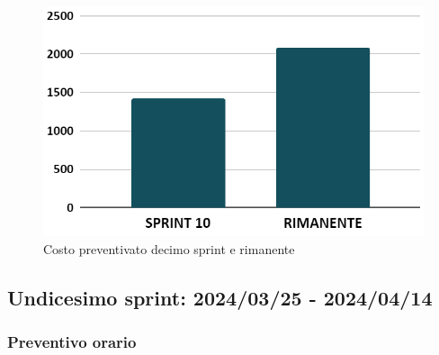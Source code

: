 \begin{figure}[h!]
    \centering
    \includegraphics[width=\textwidth]{prev10costo.png}
    \caption{Costo preventivato decimo sprint e rimanente}
    \label{fig:preventivocostodecimosprint}
\end{figure}

\newpage

\subsection{Undicesimo sprint: 2024/03/25 - 2024/04/14}
\subsubsection{Preventivo orario}

